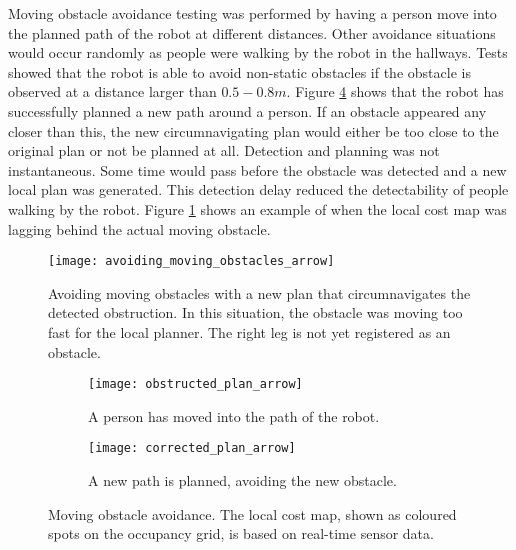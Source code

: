 Moving obstacle avoidance testing was performed by having a person move into the planned path of the robot at different distances. Other avoidance situations would occur randomly as people were walking by the robot in the hallways. Tests showed that the robot is able to avoid non-static obstacles if the obstacle is observed at a distance larger than $0.5 - 0.8 m$. Figure \ref{fig:obstacle_avoidance} shows that the robot has successfully planned a new path around a person. If an obstacle appeared any closer than this, the new circumnavigating plan would either be too close to the original plan or not be planned at all. Detection and planning was not instantaneous. Some time would pass before the obstacle was detected and a new local plan was generated. This detection delay reduced the detectability of people walking by the robot. Figure \ref{fig:avoiding_moving_obstacles} shows an example of when the local cost map was lagging behind the actual moving obstacle.



\begin{figure}[p]
	\centering
	\texttt{[image: avoiding\_moving\_obstacles\_arrow]}
	\caption{Avoiding moving obstacles with a new plan that circumnavigates the detected obstruction. In this situation, the obstacle was moving too fast for the local planner. The right leg is not yet registered as an obstacle.}
	\label{fig:avoiding_moving_obstacles}
\end{figure}

\begin{figure}
	\centering
	\begin{subfigure}[b]{0.46\textwidth}
		\texttt{[image: obstructed\_plan\_arrow]}
		\caption{A person has moved into the path of the robot.}
		\label{fig:obstructed_plan}
	\end{subfigure}
	\begin{subfigure}[b]{0.472\textwidth}
		\texttt{[image: corrected\_plan\_arrow]}
		\caption{A new path is planned, avoiding the new obstacle.}
		\label{fig:corrected_plan}
	\end{subfigure}
	\caption{Moving obstacle avoidance. The local cost map, shown as coloured spots on the occupancy grid, is based on real-time sensor data. }\label{fig:obstacle_avoidance}
\end{figure}
